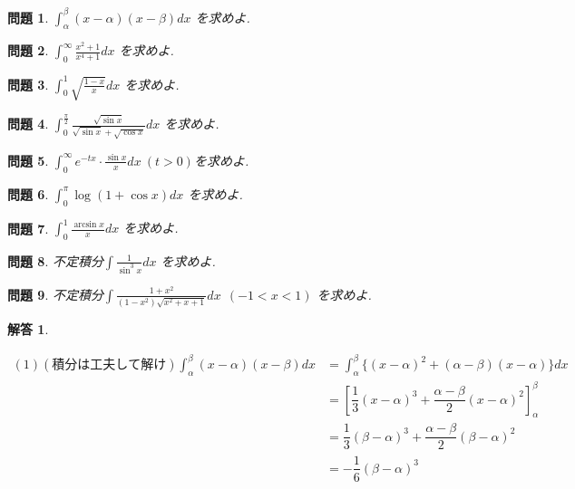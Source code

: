 \documentclass{jsarticle}
\newtheorem{question}{問題}
\newtheorem*{answer*}{解答}
\begin{document}
\begin{question}
  $\displaystyle \int_\alpha^\beta (x-\alpha)(x-\beta) dx$ を求めよ.
\end{question}

\begin{question}
$\displaystyle \int_0^{\infty} \frac{x^2+1}{x^4+1} dx$ を求めよ.
\end{question}

\begin{question}
 $\displaystyle \int_0^1 \sqrt{\frac{1-x}{x}}dx$ を求めよ.
\end{question}

\begin{question}
$\displaystyle \int_0^{\frac{\pi}{2}} \frac{\sqrt{\sin x}}{\sqrt{\sin x} + \sqrt{\cos x}} dx$ を求めよ.
\end{question}

\begin{question}
$\displaystyle \int_0^{\infty} e^{-tx}\cdot \frac{\sin x}{x} dx \ (t>0)$を求めよ.
\end{question}

\begin{question}
$\displaystyle \int_0^{\pi} \log(1+\cos x) dx$ を求めよ.
\end{question}

\begin{question}
$\displaystyle \int_0^1 \frac{\arcsin x}{x} dx$ を求めよ.
\end{question}

\begin{question}
不定積分$\displaystyle \int \frac{1}{\sin^3 x} dx$ を求めよ.
\end{question}

\begin{question}
不定積分$\displaystyle \int \frac{1+x^2}{(1-x^2)\sqrt{x^2+x+1}} dx \ \ (-1 < x < 1)$ を求めよ.
\end{question}

\bigskip
\bigskip
\bigskip
\bigskip
\bigskip
\bigskip
\bigskip
\bigskip
\bigskip
\bigskip
\bigskip
\bigskip
\bigskip
\bigskip
\bigskip
\bigskip
\bigskip
\bigskip
\bigskip
\bigskip
\bigskip
\bigskip
\bigskip
\bigskip
\bigskip
\bigskip
\bigskip
\bigskip
\bigskip
\bigskip
\bigskip
\bigskip


\begin{answer*}
\end{answer*}


\begin{align*}
(1) (積分は工夫して解け) \displaystyle \int_\alpha^\beta (x-\alpha)(x-\beta) dx
&= \displaystyle \int_\alpha^\beta \{(x-\alpha)^2 + (\alpha - \beta)(x - \alpha) \} dx \\
&= \left[\dfrac{1}{3}(x-\alpha)^3 + \dfrac{\alpha - \beta}{2} (x-\alpha)^2 \right]_\alpha^\beta \\
&= \dfrac{1}{3}(\beta - \alpha)^3 + \dfrac{\alpha-\beta}{2}(\beta - \alpha)^2 \\
&= -\dfrac{1}{6}(\beta - \alpha)^3
\end{align*}
\end{document}
